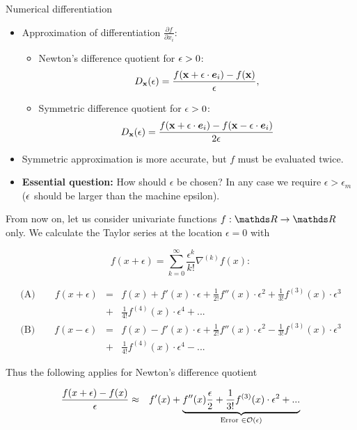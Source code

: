   \begin{vbframe}{Numerical differentiation}
  \begin{itemize}
  \item Approximation of differentiation $\frac{\partial f}{\partial
  x_{i}}$:
  \begin{itemize}
    \item Newton's difference quotient for $\epsilon > 0$: 
    $$
    D_{\mathbf{x}}(\epsilon) = \frac{f(\mathbf{x} + \epsilon\cdot \bm{e}_i) -
    f(\mathbf{x})}{\epsilon}, 
    $$
    \item Symmetric difference quotient for $\epsilon > 0$: 
    $$
    D_{\mathbf{x}}(\epsilon) = \frac{f(\mathbf{x} + \epsilon\cdot \bm{e}_i) - f(\mathbf{x} - \epsilon
    \cdot \bm{e}_{i})}{2\epsilon}
    $$
  \end{itemize}
  \item Symmetric approximation is more accurate, but $f$ must be evaluated twice.
  \item \textbf{Essential question:} How should $\epsilon$ be chosen? In any case we require $\epsilon > \epsilon_{m}$ ($\epsilon$ should be larger than the machine epsilon).
  \end{itemize}
  
  \framebreak
  
  From now on, let us consider univariate functions $f: \R \to \R$ only. We calculate the Taylor series at the location $\epsilon = 0$ with
  
  $$
    f(x + \epsilon) = \sum_{k=0}^\infty \frac{\epsilon^k}{k!} \nabla^{(k)} f(x):
  $$
  
  \begin{eqnarray*}
  \text{(A)} \qquad f(x + \epsilon) &=& f(x) + f'(x) \cdot \epsilon + \frac{1}{2 !}f''(x)\cdot\epsilon^2 + \frac{1}{3 !}f^{(3)}(x)\cdot\epsilon^3 \\ &+& \frac{1}{4 !}f^{(4)}(x)\cdot\epsilon^4 + ... \\
  \text{(B)} \qquad  f(x - \epsilon) &=& f(x) - f'(x) \cdot \epsilon + \frac{1}{2 !}f''(x)\cdot\epsilon^2 - \frac{1}{3 !}f^{(3)}(x)\cdot\epsilon^3 \\ &+& \frac{1}{4 !}f^{(4)}(x)\cdot\epsilon^4 - ...
  \end{eqnarray*}
  
  \framebreak
  
  Thus the following applies for Newton's difference quotient
  
  \begin{footnotesize}
  \begin{eqnarray*}
  \frac{f(x + \epsilon) - f(x)}{\epsilon} &\approx&
  f\!\,'(x) +
  \underbrace{f\!\,''(x)\frac{\epsilon}{2} + \frac{1}{3 !}f^{(3)}(x)\cdot\epsilon^2 + ... }_{\text{Error } \in \mathcal{O}(\epsilon)}
  \end{eqnarray*}
  \end{footnotesize}
  

\end{vbframe}
